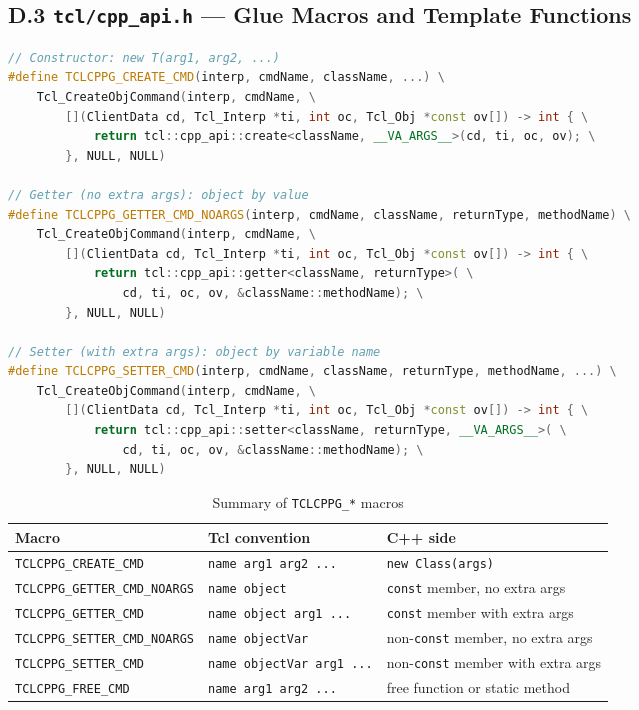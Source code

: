 \subsection*{D.3 \texttt{tcl/cpp\_api.h} --- Glue Macros and Template Functions}

\begin{lstlisting}[language=C++, caption={Key macros from \texttt{tcl/cpp\_api.h}}]
// Constructor: new T(arg1, arg2, ...)
#define TCLCPPG_CREATE_CMD(interp, cmdName, className, ...) \
    Tcl_CreateObjCommand(interp, cmdName, \
        [](ClientData cd, Tcl_Interp *ti, int oc, Tcl_Obj *const ov[]) -> int { \
            return tcl::cpp_api::create<className, __VA_ARGS__>(cd, ti, oc, ov); \
        }, NULL, NULL)

// Getter (no extra args): object by value
#define TCLCPPG_GETTER_CMD_NOARGS(interp, cmdName, className, returnType, methodName) \
    Tcl_CreateObjCommand(interp, cmdName, \
        [](ClientData cd, Tcl_Interp *ti, int oc, Tcl_Obj *const ov[]) -> int { \
            return tcl::cpp_api::getter<className, returnType>( \
                cd, ti, oc, ov, &className::methodName); \
        }, NULL, NULL)

// Setter (with extra args): object by variable name
#define TCLCPPG_SETTER_CMD(interp, cmdName, className, returnType, methodName, ...) \
    Tcl_CreateObjCommand(interp, cmdName, \
        [](ClientData cd, Tcl_Interp *ti, int oc, Tcl_Obj *const ov[]) -> int { \
            return tcl::cpp_api::setter<className, returnType, __VA_ARGS__>( \
                cd, ti, oc, ov, &className::methodName); \
        }, NULL, NULL)
\end{lstlisting}

\begin{table}[H]
\centering
\caption{Summary of \texttt{TCLCPPG\_*} macros}
\begin{tabular}{@{}L{5.8cm}L{3.0cm}L{5.2cm}@{}}
\toprule
\textbf{Macro} & \textbf{Tcl convention} & \textbf{C++ side} \\
\midrule
\texttt{TCLCPPG\_CREATE\_CMD} & \texttt{name arg1 arg2 ...} & \texttt{new Class(args)} \\
\texttt{TCLCPPG\_GETTER\_CMD\_NOARGS} & \texttt{name object} & \texttt{const} member, no extra args \\
\texttt{TCLCPPG\_GETTER\_CMD} & \texttt{name object arg1 ...} & \texttt{const} member with extra args \\
\texttt{TCLCPPG\_SETTER\_CMD\_NOARGS} & \texttt{name objectVar} & non-\texttt{const} member, no extra args \\
\texttt{TCLCPPG\_SETTER\_CMD} & \texttt{name objectVar arg1 ...} & non-\texttt{const} member with extra args \\
\texttt{TCLCPPG\_FREE\_CMD} & \texttt{name arg1 arg2 ...} & free function or static method \\
\bottomrule
\end{tabular}
\end{table}

